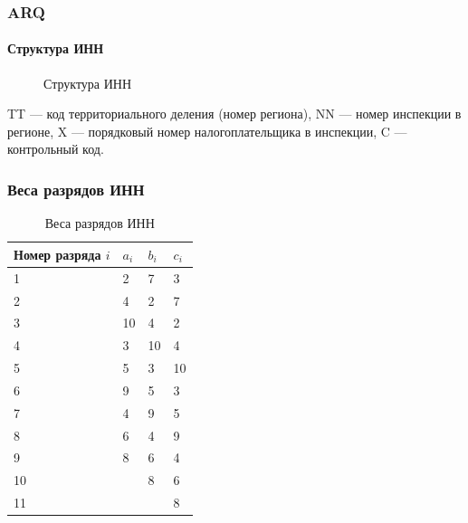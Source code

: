\begin{frame}
    \frametitle{ARQ}
    \framesubtitle{Структура ИНН}
    
    \begin{figure}
        \begin{center}
            \caption{Структура ИНН}\label{pict:inn}
        \end{center}
    \end{figure}
    \alert{TT} --- код территориального деления (номер региона), \alert{NN} --- номер инспекции в регионе, \alert{X} --- порядковый номер налогоплательщика в инспекции, \alert{C} --- контрольный код.
\end{frame}


\begin{frame}
    \frametitle{Веса разрядов ИНН}
    \begin{table}[ht]
        \caption{Веса разрядов ИНН}\label{t:innWeights}
        \centering
        \begin{tabular}[c]{|l|l|l|l|}
            \hline\hline
            Номер разряда $i$   &$a_i$  &$b_i$  &$c_i$ \\
            \hline
            1                   &2      &7      &3 \\
            2                   &4      &2      &7 \\
            3                   &10     &4      &2 \\
            4                   &3      &10     &4 \\
            5                   &5      &3      &10\\
            6                   &9      &5      &3 \\
            7                   &4      &9      &5 \\
            8                   &6      &4      &9 \\
            9                   &8      &6      &4 \\
            10                  &       &8      &6 \\
            11                  &       &       &8 \\
            \hline
        \end{tabular}
    \end{table}
\end{frame}


